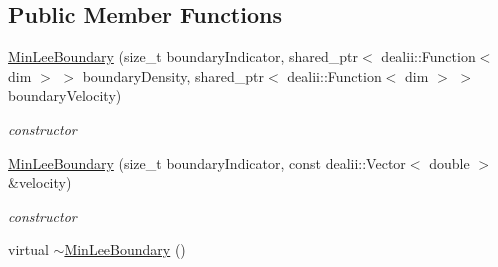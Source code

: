 \subsection*{Public Member Functions}
\begin{DoxyCompactItemize}
\item 
\hypertarget{classnatrium_1_1MinLeeBoundary_a1e9acd91ee2b97783932c4df45d38668}{
\hyperlink{classnatrium_1_1MinLeeBoundary_a1e9acd91ee2b97783932c4df45d38668}{MinLeeBoundary} (size\_\-t boundaryIndicator, shared\_\-ptr$<$ dealii::Function$<$ dim $>$ $>$ boundaryDensity, shared\_\-ptr$<$ dealii::Function$<$ dim $>$ $>$ boundaryVelocity)}
\label{classnatrium_1_1MinLeeBoundary_a1e9acd91ee2b97783932c4df45d38668}

\begin{DoxyCompactList}\small\item\em constructor \item\end{DoxyCompactList}\item 
\hypertarget{classnatrium_1_1MinLeeBoundary_a6bd31d48ffaf23ac74bc303b379b4ca8}{
\hyperlink{classnatrium_1_1MinLeeBoundary_a6bd31d48ffaf23ac74bc303b379b4ca8}{MinLeeBoundary} (size\_\-t boundaryIndicator, const dealii::Vector$<$ double $>$ \&velocity)}
\label{classnatrium_1_1MinLeeBoundary_a6bd31d48ffaf23ac74bc303b379b4ca8}

\begin{DoxyCompactList}\small\item\em constructor \item\end{DoxyCompactList}\item 
\hypertarget{classnatrium_1_1MinLeeBoundary_ab2409b8dceb378d7e2bdb457e8c5f374}{
virtual \hyperlink{classnatrium_1_1MinLeeBoundary_ab2409b8dceb378d7e2bdb457e8c5f374}{$\sim$MinLeeBoundary} ()}
\label{classnatrium_1_1MinLeeBoundary_ab2409b8dceb378d7e2bdb457e8c5f374}


\end{DoxyCompactItemize}

